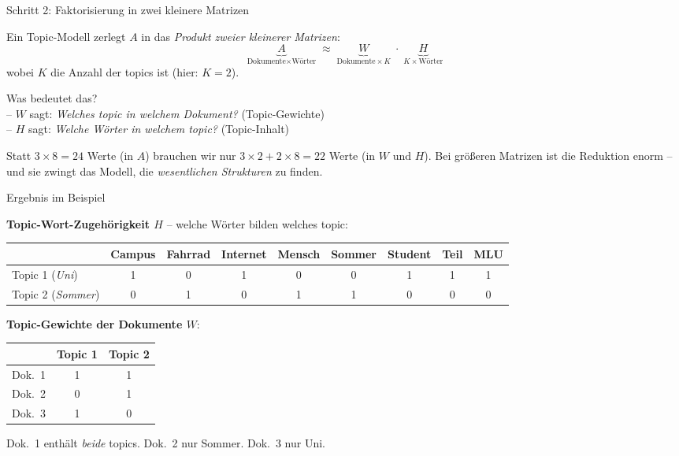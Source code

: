 \documentclass[aspectratio=169,11pt]{beamer}
\let\oldemph\emph
\renewcommand{\emph}[1]{{\color{solCyan}\oldemph{#1}}}
\let\oldtextbf\textbf
\renewcommand{\textbf}[1]{{\color{solBase3}\oldtextbf{#1}}}
\begin{document}
\begin{frame}{Schritt 2: Faktorisierung in zwei kleinere Matrizen}

  Ein Topic-Modell zerlegt $A$ in das \emph{Produkt zweier kleinerer
  Matrizen}:
  \[
    \underbrace{A}_{\text{Dokumente}\times\text{Wörter}}
    \;\approx\;
    \underbrace{W}_{\text{Dokumente}\times K}
    \;\cdot\;
    \underbrace{H}_{K\times\text{Wörter}}
  \]
  wobei $K$ die Anzahl der topics ist (hier: $K=2$).

  \vfill
  Was bedeutet das? \\[6pt]
  – $W$ sagt: \emph{Welches topic in welchem Dokument?} (Topic-Gewichte) \\
  – $H$ sagt: \emph{Welche Wörter in welchem topic?} (Topic-Inhalt)

  \vfill
  Statt $3\times 8 = 24$ Werte (in $A$) brauchen wir nur
  $3\times 2 + 2\times 8 = 22$ Werte (in $W$ und $H$).
  Bei größeren Matrizen ist die Reduktion enorm – und sie zwingt das
  Modell, die \emph{wesentlichen Strukturen} zu finden.

\end{frame}

\begin{frame}{Ergebnis im Beispiel}

  \textbf{Topic-Wort-Zugehörigkeit $H$} – welche Wörter bilden welches topic:
  \footnotesize
  \begin{center}
    \begin{tabular}{@{}l|cccccccc@{}}
      \toprule
      & Campus & Fahrrad & Internet & Mensch & Sommer & Student & Teil & MLU \\
      \midrule
      Topic 1 (\textit{Uni}) & 1 & 0 & 1 & 0 & 0 & 1 & 1 & 1 \\
      Topic 2 (\textit{Sommer}) & 0 & 1 & 0 & 1 & 1 & 0 & 0 & 0 \\
      \bottomrule
    \end{tabular}
  \end{center}

  \normalsize
  \vfill
  \textbf{Topic-Gewichte der Dokumente $W$}:
  \footnotesize
  \begin{center}
    \begin{tabular}{@{}l|cc@{}}
      \toprule
      & Topic 1 & Topic 2 \\
      \midrule
      Dok.\ 1 & 1 & 1 \\
      Dok.\ 2 & 0 & 1 \\
      Dok.\ 3 & 1 & 0 \\
      \bottomrule
    \end{tabular}
  \end{center}

  \normalsize
  \vfill
  Dok.\ 1 enthält \emph{beide} topics. Dok.\ 2 nur Sommer. Dok.\ 3 nur Uni.

\end{frame}
\end{document}
